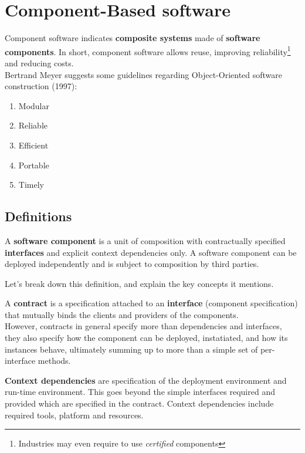 \chapter{Component-Based software}
Component software indicates \textbf{composite systems} made of \textbf{software components}.
In short, component software allows reuse, improving reliability\footnote{Industries may even require to use \textit{certified} components} and reducing costs.\\
Bertrand Meyer suggests some guidelines regarding Object-Oriented software construction (1997):
\begin{enumerate}[noitemsep]
    \item Modular
    \item Reliable
    \item Efficient
    \item Portable
    \item Timely
\end{enumerate}

\section{Definitions}
\begin{definition}
    A \textbf{software component} is a unit of composition with
    contractually specified \textbf{interfaces} and explicit context
    dependencies only. A software component can be
    deployed independently and is subject to
    composition by third parties.
\end{definition}

Let's break down this definition, and explain the key concepts it mentions.


A \textbf{contract} is a specification attached to an \textbf{interface} (component specification) that
mutually binds the clients and providers of the components.\\
However, contracts in general specify more than dependencies and interfaces, they also specify how the component can be deployed, instatiated, and how its instances behave, ultimately summing up to more than a simple set of per-interface methods.

\textbf{Context dependencies} are specification of the deployment
environment and run-time environment.
This goes beyond the simple interfaces required and provided which are specified in the contract.
Context dependencies include required tools, platform and resources.

